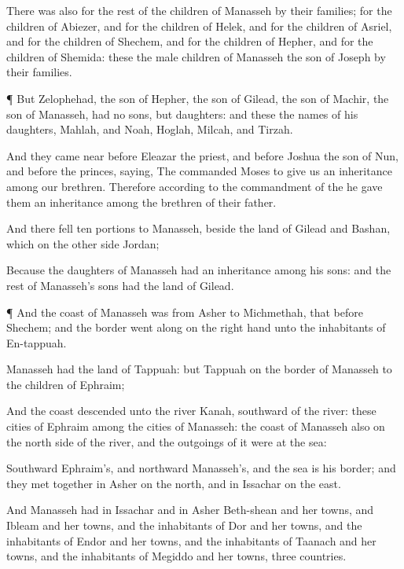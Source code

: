 {There was also
{} for the
rest of the
children of
Manasseh by their
families; for the
children of
Abiezer, and for the
children of
Helek, and for the
children of
Asriel, and for the
children of
Shechem, and for the
children of
Hepher, and for the
children of
Shemida: these
{} the
male
children of
Manasseh the
son of
Joseph by their
families.


\par }{\PP {}¶ But
Zelophehad, the
son of
Hepher, the
son of
Gilead, the
son of
Machir, the
son of
Manasseh, had no
sons, but
daughters: and these
{} the
names of his
daughters,
Mahlah, and
Noah,
Hoglah,
Milcah, and
Tirzah.

And they came
near
before
Eleazar the
priest, and
before
Joshua the
son of
Nun, and
before the
princes,
saying, The
{}
commanded
Moses to
give us an
inheritance
among our
brethren. Therefore according to the
commandment of the
{} he
gave them an
inheritance
among the
brethren of their
father.

And there
fell
ten
portions to
Manasseh, beside the
land of
Gilead and
Bashan, which
{} on the other
side
Jordan;

Because the
daughters of
Manasseh
had an
inheritance
among his
sons: and the
rest of
Manasseh’s
sons had the
land of
Gilead.


\par }{\PP {}¶ And the
coast of
Manasseh was from
Asher to
Michmethah, that
{}
before
Shechem; and the
border went
along on the right
hand unto the
inhabitants of
En-tappuah.

Manasseh had the
land of
Tappuah: but
Tappuah on the
border of
Manasseh
{} to the
children of
Ephraim;

And the
coast
descended unto the
river
Kanah,
southward of the
river: these
cities of
Ephraim
{}
among the
cities of
Manasseh: the
coast of
Manasseh also
{} on the north
side of the
river, and the
outgoings of it were at the
sea:

Southward
{}
Ephraim’s, and
northward
{}
Manasseh’s, and the
sea is his
border; and they met
together in
Asher on the
north, and in
Issachar on the
east.

And
Manasseh had in
Issachar and in
Asher
Beth-shean and her
towns, and
Ibleam and her
towns, and the
inhabitants of
Dor and her
towns, and the
inhabitants of
Endor and her
towns, and the
inhabitants of
Taanach and her
towns, and the
inhabitants of
Megiddo and her
towns,
{}
three
countries.

}

